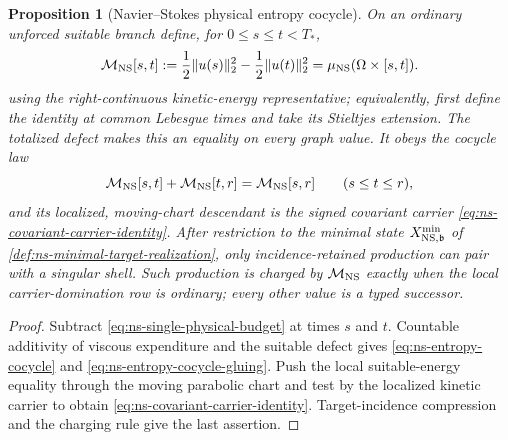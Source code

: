 \documentclass[11pt]{article}
\numberwithin{section}{part}
\theoremstyle{plain}
\newtheorem{proposition}[proposition]{Proposition}
\theoremstyle{definition}
\theoremstyle{remark}
\begin{document}
\begin{proposition}[Navier--Stokes physical entropy cocycle]
\label{prop:ns-physical-entropy-cocycle}
On an ordinary unforced suitable branch define, for \(0\le s\le t<T_*\),
\begin{equation}
 \label{eq:ns-entropy-cocycle}
\mathcal M_{\rm NS}[s,t]
 :=\frac12\|u(s)\|_2^2-\frac12\|u(t)\|_2^2
 =\mu_{\rm NS}(\Omega\times[s,t]).
\end{equation}
using the right-continuous kinetic-energy representative; equivalently, first
define the identity at common Lebesgue times and take its Stieltjes extension.
The totalized defect makes this an equality on every graph value.  It obeys
the cocycle law
\begin{equation}
 \label{eq:ns-entropy-cocycle-gluing}
 \mathcal M_{\rm NS}[s,t]
 +\mathcal M_{\rm NS}[t,r]
 =\mathcal M_{\rm NS}[s,r]
 \qquad(s\le t\le r),
\end{equation}
and its localized, moving-chart descendant is the signed covariant carrier
\eqref{eq:ns-covariant-carrier-identity}.  After restriction to the minimal
state \(X^{\min}_{{\rm NS},\mathfrak b}\) of
\cref{def:ns-minimal-target-realization}, only incidence-retained production can
pair with a singular shell.  Such production is charged by
\(\mathcal M_{\rm NS}\) exactly when the local carrier-domination row is
ordinary; every other value is a typed successor.
\end{proposition}

\begin{proof}
Subtract \eqref{eq:ns-single-physical-budget} at times \(s\) and \(t\).
Countable additivity of viscous expenditure and the suitable defect gives
\eqref{eq:ns-entropy-cocycle} and
\eqref{eq:ns-entropy-cocycle-gluing}.  Push the local suitable-energy equality
through the moving parabolic chart and test by the localized kinetic carrier
to obtain \eqref{eq:ns-covariant-carrier-identity}.  Target-incidence
compression and the charging rule give the last assertion.
\end{proof}
\end{document}
